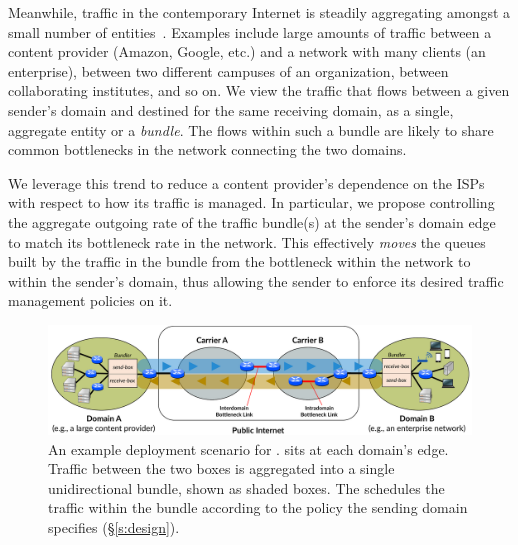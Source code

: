 
Meanwhile, traffic in the contemporary Internet is steadily aggregating amongst a small number of entities~\cite{fivecomps}. 
Examples include large amounts of traffic between a content provider (\eg Amazon, Google, etc.) and a network with many clients (\eg an enterprise), between two different campuses of an organization, between collaborating institutes, and so on.
We view the traffic that flows between a given sender's domain and destined for the same receiving domain, as a single, aggregate entity or a \emph{bundle}.
The flows within such a bundle are likely to share common bottlenecks in the network connecting the two domains.

We leverage this trend to reduce a content provider's dependence on the ISPs with respect to how its traffic is managed. In particular, we propose controlling the aggregate outgoing rate of the traffic bundle(s) at the sender's domain edge to match its bottleneck rate in the network. This effectively \emph{moves}
the queues built by the traffic in the bundle from the bottleneck within the network to within the sender’s domain, thus allowing the sender to enforce its desired traffic management policies on it. 






\begin{figure}[t]
    \centering
    \includegraphics[width=\textwidth]{img/deployment-arch.pdf}
    \caption{An example deployment scenario for \name. 
    \name sits at each domain's edge. Traffic between the two boxes is aggregated into a single unidirectional bundle, shown as shaded boxes. The \inbox schedules the traffic within the bundle according to the policy the sending domain specifies (\S\ref{s:design}).
    }\label{fig:deploy:arch}
\end{figure}

